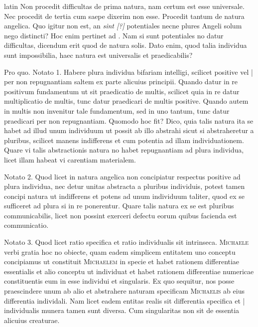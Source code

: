 \begin{otherlanguage*}{latin}
\pstart
Non procedit difficultas de prima natura, nam certum est esse universale. Nec procedit de tertia cum saepe dixerim non esse. Procedit tantum de natura angelica. Quo igitur non est, an \emph{sint [?]} potentiales necne plures Angeli solum nego distincti? Hoc enim pertinet ad . Nam si sunt potentiales no datur difficultas, dicendum erit quod de natura solis. Dato enim, quod talia individua sunt impossibilia, haec natura est universalis et praedicabilis? 
\pend

\pstart
Pro quo. Notato 1. Habere plura individua bifariam intelligi, scilicet positive vel \textnormal{|} per non repugnantiam saltem ex parte alicuius principii. Quando datur in re positivum fundamentum ut sit praedicatio de multis, scilicet quia in re datur multiplicatio de multis, tunc datur praedicari de multis positive. Quando autem in multis non invenitur tale fundamentum, sed in uno tantum, tunc datur praedicari per non repugnantiam. Quomodo hoc fit? Dico, quia talis natura ita se habet ad illud unum individuum ut possit ab illo abstrahi sicut si abstraheretur a pluribus, scilicet manens indifferens et cum potentia ad illam individuationem. Quare vi talis abstractionis natura no habet repugnantiam ad plura individua, licet illam habeat vi carentiam materialem. 
\pend

\pstart
Notato 2. Quod licet in natura angelica non concipiatur respectus positive ad plura individua, nec detur unitas abstracta a pluribus individuis, potest tamen concipi natura ut indifferens et potens ad unum individuum taliter, quod ex se sufficeret ad plura si in re ponerentur. Quare talis natura ex se est pluribus communicabilis, licet non possint exerceri defectu eorum quibus facienda est communicatio. 
\pend

\pstart
Notato 3. Quod licet ratio specifica et ratio individualis sit intrinseca. \textsc{Michaele}\index[persons]{} verbi gratia hoc no obiecte, quam eadem simplicem entitatem uno conceptu concipiamus ut constituit \textsc{Michaelem}\index[persons]{} in specie et habet rationem differentiae essentialis et alio conceptu ut individuat et habet rationem differentiae numericae constituentis eum in esse individui et singularis. Ex quo sequitur, nos posse praescindere unum ab alio et abstrahere naturam specificam \textsc{Michaelis}\index[persons]{} ab eius differentia individali. Nam licet eadem entitas realis sit differentia specifica et \textnormal{|} individualis munera tamen sunt diversa. Cum singularitas non sit de essentia alicuius creaturae. 
\pend


\end{otherlanguage*}
